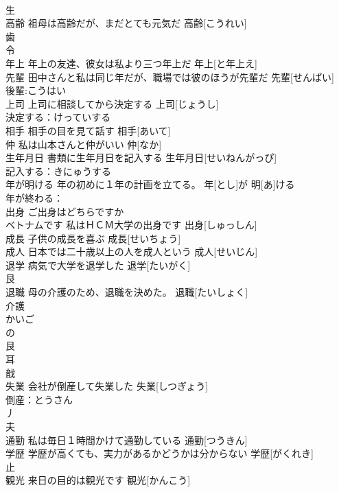 \documentclass[8pt]{extreport}
\begin{document}
\begin{CJK}{UTF8}{min}
\\	生 
\\	高齢	祖母は高齢だが、まだとても元気だ	高齢[こうれい]			
\\	歯 
\\	令 
\\	年上	年上の友達、彼女は私より三つ年上だ	年上[と年上え]			
\\	先輩	田中さんと私は同じ年だが、職場では彼のほうが先輩だ	先輩[せんぱい]			
\\	後輩:こうはい
\\	上司	上司に相談してから決定する	上司[じょうし]			
\\	決定する：けっていする
\\	相手	相手の目を見て話す	相手[あいて]			
\\	仲	私は山本さんと仲がいい	仲[なか]			
\\	生年月日	書類に生年月日を記入する	生年月日[せいねんがっぴ]			
\\	記入する：きにゅうする
\\	年が明ける	年の初めに１年の計画を立てる。	年[とし]が 明[あ]ける			
\\	年が終わる：
\\	出身	ご出身はどちらですか 
\\	ベトナムです 私はＨＣＭ大学の出身です	出身[しゅっしん]			
\\	成長	子供の成長を喜ぶ	成長[せいちょう]			
\\	成人	日本では二十歳以上の人を成人という	成人[せいじん]			
\\	退学	病気で大学を退学した	退学[たいがく]			
\\	艮 
\\	退職	母の介護のため、退職を決めた。	退職[たいしょく]			
\\	介護 
\\	かいご
\\	の 
\\	艮 
\\	耳 
\\	戠 
\\	失業	会社が倒産して失業した	失業[しつぎょう]			
\\	倒産：とうさん
\\	丿 
\\	夫 
\\	通勤	私は毎日１時間かけて通勤している	通勤[つうきん]			
\\	学歴	学歴が高くても、実力があるかどうかは分からない	学歴[がくれき]			
\\	止 
\\	観光	来日の目的は観光です	観光[かんこう]			

\end{CJK}
\end{document}
